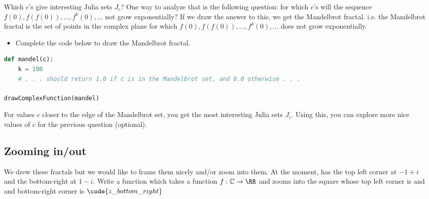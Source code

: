 \documentclass[letterpaper,11pt]{amsart}
\theoremstyle{plain}
\theoremstyle{definition}
\begin{document}
Which $c$'s give interesting Julia sets $J_c$? One way to analyze that is the following question: for which $c$'s will the sequence $f(0), f(f(0)), \dots, f^k(0),\dots$ not grow exponentially? If we draw the answer to this, we get the Mandelbrot fractal. i.e. the Mandelbrot fractal is the set of points in the complex plane for which  $f(0), f(f(0)), \dots, f^k(0),\dots$ does not grow exponentially.

\begin{itemize}
  \item Complete the code below to draw the Mandelbrot fractal. 
\end{itemize}


\begin{lstlisting}[language=python]
def mandel(c):
    k = 100
    # . . . should return 1.0 if c is in the Mandelbrot set, and 0.0 otherwise . . . 

drawComplexFunction(mandel)
\end{lstlisting}

For values $c$ closer to the edge of the Mandelbrot set, you get the most interesting Julia sets $J_c$. Using this, you can explore more nice values of $c$ for the previous question (optional). 

\subsection*{Zooming in/out}

We drew these fractals but we would like to frame them nicely and/or zoom into them. At the moment,  has the top left corner at $-1 + i$ and the bottom-right at $1 - i$. Write a function  which takes a function $f: \mathbb{C} \to \RR$ and zooms into the square whose top left corner is  and and bottom-right corner is $\code{z\_bottom\_right}$
\end{document}
